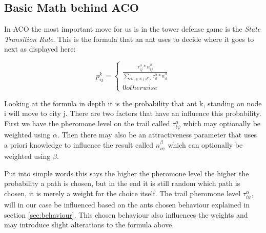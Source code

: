 \subsection{Basic Math behind ACO}

In ACO the most important move for us is in the tower defense game is the \textit{State Transition Rule}. This is the formula that an ant uses to decide where it goes to next as displayed here\cite{dorigo2006ant}:

\begin{equation}
p^k_{ij}=
\begin{cases}
\frac{\tau^\alpha_{ij}*n^\beta_{ij}}{\sum_{ciL\in N(s^P)}\tau^\alpha_{il}*n^\beta_{il}} \\
0 otherwise
\end{cases}
\end{equation}

Looking at the formula in depth it is the probability that ant k, standing on node i will move to city j\cite{maniezzo2002ant}.
There are two factors that have an influence this probability.
First we have the pheromone level on the trail called $\tau^\alpha_{i\psi}$ which may optionally be weighted using $\alpha$.
Then there may also be an attractiveness parameter that uses a priori knowledge to influence the result called $n^\beta_{i\psi}$ which can optionally be weighted using $\beta$\cite{dorigo2006ant}.

Put into simple words this says the higher the pheromone level the higher the probability a path is chosen, but in the end it is still random which path is chosen, it is merely a weight for the choice itself.
The trail pheromone level $\tau^\alpha_{i\psi}$, will in our case be influenced based on the ants chosen behaviour explained in section \ref{sec:behaviour}. This chosen behaviour also influences the weights and may introduce slight alterations to the formula above.